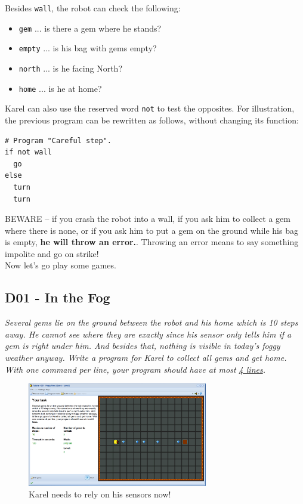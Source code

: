\documentclass[article,A4,12pt]{llncs}
\begin{document}
Besides {\tt wall}, the robot can check the following:
\begin{itemize}
\item {\tt gem} ... is there a gem where he stands?
\item {\tt empty} ... is his bag with gems empty?
\item {\tt north} ... is he facing North?
\item {\tt home} ... is he at home?
\end{itemize}
Karel can also use the reserved word {\tt not} to test the opposites.
For illustration, the previous program can be rewritten as follows, without changing its function:
\begin{verbatim}
# Program "Careful step".
if not wall
  go
else
  turn
  turn
\end{verbatim}
BEWARE -- if you crash the robot into a wall, if you ask him to collect a gem where there
is none, or if you ask him to put a gem on the ground while 
his bag is empty, {\bf he will throw an error.}. Throwing an error 
means to say something impolite and go on strike!\\

\noindent
Now let's go play some games.

\subsection{D01 - In the Fog}

{\em Several gems lie on the ground between the robot and his home which is 10 steps away. 
He cannot see where they are exactly since his sensor only tells him if a gem is right 
under him.  And besides that, nothing is visible in today's foggy weather anyway. 
Write a program for Karel to collect all gems and get home. With one command per 
line, your program should have at most \underline{4 lines}.}


\begin{figure}[!ht]
\begin{center}
\includegraphics[width=0.7\textwidth]{img/d01.png}
\end{center}
\vspace{-4mm}
\caption{Karel needs to rely on his sensors now!}
\label{fig:d01}
\vspace{-4mm}
\end{figure}
\noindent
\end{document}
